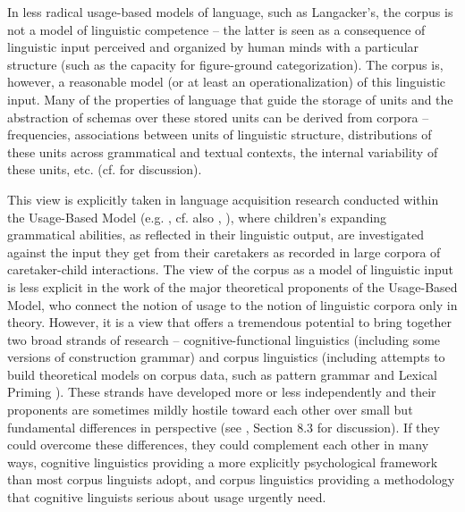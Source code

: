 In less radical usage\hyp{}based models of language, such as Langacker's, the corpus is not a model of linguistic competence  -- the latter is seen as a consequence of linguistic input perceived and organized by human minds with a particular structure (such as the capacity for figure\hyp{}ground categorization).  The corpus is, however, a reasonable model (or at least an operationalization)  of this linguistic input. Many of the properties of language that guide the storage of units and the abstraction of schemas over these stored units can be derived from corpora -- frequencies,  associations  between units of linguistic structure, distributions  of these units across grammatical  and textual contexts, the internal variability of these units, etc. (cf. \citealt{stefanowitsch_corpus-based_2016} for discussion).

This view is explicitly taken in language acquisition  research conducted within the Usage\hyp{}Based Model (e.g. \citealt{tomasello_constructing_2003}, cf. also \citealt{dabrowska_formula_2001}, \citealt{diessel_acquisition_2004}), where children's expanding grammatical abilities, as reflected in their linguistic output, are investigated against the input they get from their caretakers as recorded in large  corpora of caretaker\hyp{}child interactions. The view of the corpus as a model of linguistic input is less explicit in the work of the major theoretical proponents of the Usage\hyp{}Based Model, who connect the notion of usage to the notion of linguistic corpora only in theory. However, it is a view that offers a tremendous potential to bring together two broad strands of research -- cognitive\hyp{}functional  linguistics (including some versions of construction grammar)  and corpus linguistics (including attempts to build theoretical models on corpus data, such as pattern grammar  \citep{hunston_pattern_2000} and Lexical Priming  \citep{hoey_lexical_2005}). These strands have developed more or less independently and their proponents are sometimes mildly hostile toward each other over small but fundamental differences in perspective (see \citealt{mcenery_corpus_2012}, Section 8.3 for discussion). If they could overcome these differences, they could complement each other in many ways, cognitive  linguistics providing a more explicitly psychological  framework than most corpus linguists adopt, and corpus linguistics providing a methodology that cognitive  linguists serious about usage urgently need.

